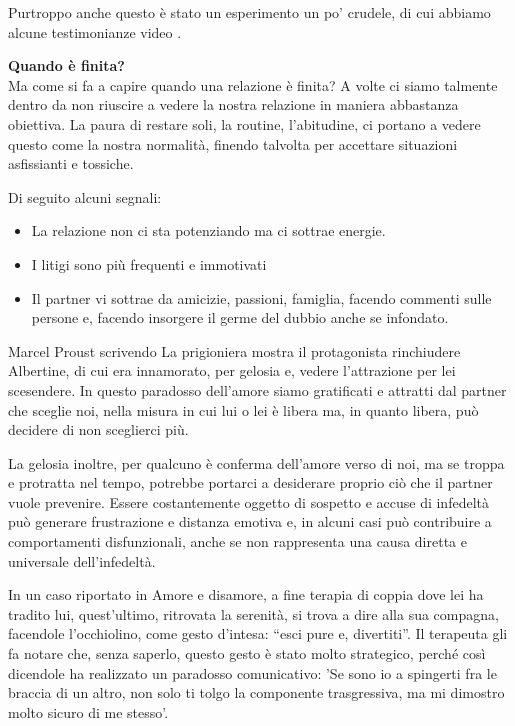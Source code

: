 \documentclass[12pt]{book} %
\begin{document}
\begin{mdframed}[linewidth=1pt]
Purtroppo anche questo è stato un esperimento un po' crudele, di cui abbiamo alcune testimonianze
video
.
\end{mdframed} 

\noindent \textbf{\large Quando è finita?} \\
Ma come si fa a capire quando una relazione è finita? A volte ci siamo talmente dentro da non riuscire a vedere la nostra relazione in maniera abbastanza 
obiettiva. La paura di restare soli, la routine,
l'abitudine, ci portano a vedere questo come la nostra normalità, finendo talvolta per accettare situazioni asfissianti e tossiche. 

Di seguito alcuni segnali:

\begin{itemize}
\item La relazione non ci sta potenziando ma ci sottrae energie.
\item I litigi sono più frequenti e immotivati 
\item Il partner vi sottrae da amicizie, passioni, famiglia, facendo commenti sulle persone e, facendo insorgere il germe del dubbio anche se infondato.
\end{itemize}

\begin{mdframed}[linewidth=1pt]
Marcel Proust scrivendo La prigioniera mostra il protagonista rinchiudere Albertine, di cui era innamorato, per gelosia e, vedere l'attrazione per
lei scesendere. In questo paradosso dell'amore siamo gratificati e attratti dal partner che sceglie noi, nella misura in cui lui o lei è libera ma, in quanto libera, può decidere di non sceglierci più.

La gelosia inoltre, per qualcuno è conferma dell'amore verso di noi, ma se troppa e protratta nel
tempo, potrebbe portarci a desiderare proprio ciò che il partner vuole prevenire. Essere costantemente oggetto di sospetto e accuse di infedeltà può generare frustrazione e distanza emotiva e, in alcuni casi può contribuire a comportamenti disfunzionali, anche se non rappresenta una causa diretta e universale dell’infedeltà.

In un caso riportato in Amore e disamore, a fine terapia di coppia dove
lei ha tradito lui, quest'ultimo, ritrovata la serenità, si trova a dire alla sua compagna,
facendole l'occhiolino, come gesto d'intesa: “esci pure e, divertiti”. Il
terapeuta gli fa notare che, senza saperlo, questo gesto è stato molto strategico, perché così dicendole ha realizzato
un paradosso comunicativo: 'Se sono io a spingerti fra le braccia di un altro, non solo ti tolgo
la componente trasgressiva, ma mi dimostro molto sicuro di me stesso'.
\end{mdframed}
\end{document}

